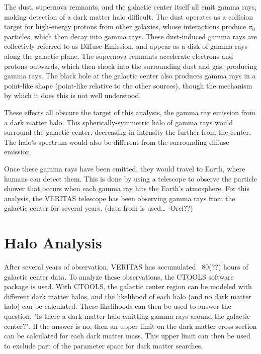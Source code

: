 The dust, supernova remnants, and the galactic center itself all emit gamma rays, making detection of a dark matter halo difficult.
The dust operates as a collision target for high-energy protons from other galaxies, whose interactions produce $\pi_0$ particles, which then decay into gamma rays.
These dust-induced gamma rays are collectivly referred to as Diffuse Emission, and appear as a disk of gamma rays along the galactic plane.
The supernova remnants accelerate electrons and protons outwards, which then shock into the surrounding dust and gas, producing gamma rays.
The black hole at the galactic center also produces gamma rays in a point-like shape (point-like relative to the other sources), though the mechanism by which it does this is not well understood\cite{gal_cent_still_undetermined}.

These effects all obscure the target of this analysis, the gamma ray emission from a dark matter halo.
This spherically-symmetric halo of gamma rays would surround the galactic center, decreasing in intensity the further from the center.
The halo's spectrum would also be different from the surrounding diffuse emission.

Once these gamma rays have been emitted, they would travel to Earth, where humans can detect them.
This is done by using a telescope to observe the particle shower that occurs when each gamma ray hits the Earth's atmosphere.
For this analysis, the VERITAS telescope has been observing gamma rays from the galactic center for several years.
(data from is used… -Orel??)


\section{Halo Analysis}
After several years of observation, VERITAS has accumulated ~80(??) hours of galactic center data.
To analyze these observations, the CTOOLS software package \cite{gammalibctools} is used.
With CTOOLS, the galactic center region can be modeled with different dark matter halos, and the likelihood of each halo (and no dark matter halo) can be calculated.
These likelihoods can then be used to answer the question, "Is there a dark matter halo emitting gamma rays around the galactic center?".
If the answer is no, then an upper limit on the dark matter cross section can be calculated for each dark matter mass.
This upper limit can then be used to exclude part of the parameter space for dark matter searches.


